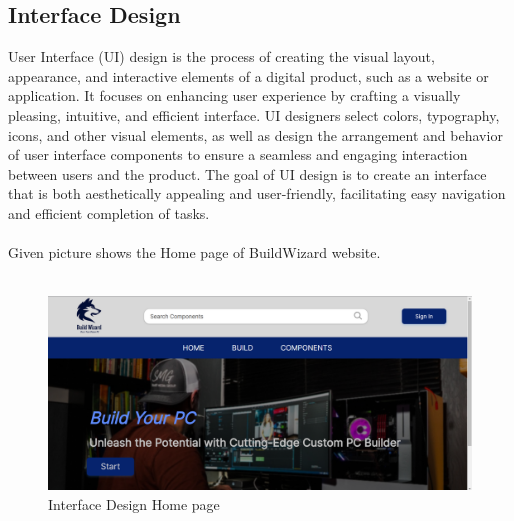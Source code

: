       \subsection{Interface Design}
      User Interface (UI) design is the process of creating the visual layout, appearance, and interactive elements of a digital product, such as a website or application. It focuses on enhancing user experience by crafting a visually pleasing, intuitive, and efficient interface. UI designers select colors, typography, icons, and other visual elements, as well as design the arrangement and behavior of user interface components to ensure a seamless and engaging interaction between users and the product. The goal of UI design is to create an interface that is both aesthetically appealing and user-friendly, facilitating easy navigation and efficient completion of tasks.\\\\
      Given picture shows the Home page of BuildWizard website.\\\\
      \begin{figure}[H]
      \centering
      \includegraphics[width=15cm]{Diagrams/UIHOME.png}
      \caption{Interface Design Home page}
      \end{figure}
      

